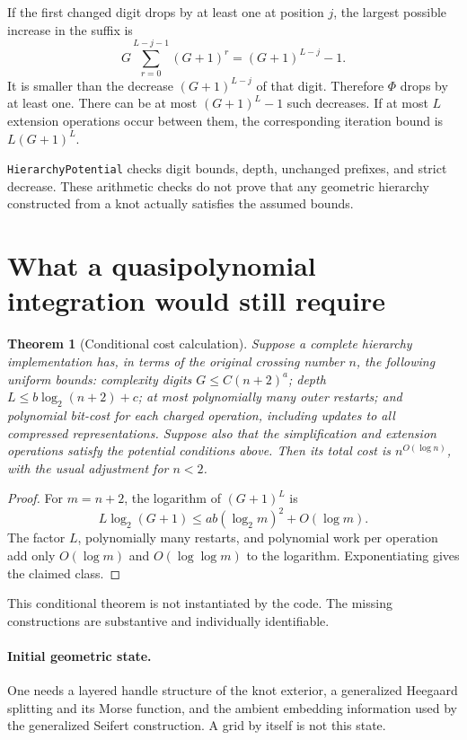 \documentclass[11pt]{article}
\newtheorem{theorem}{Theorem}[section]
\newcommand{\code}[1]{\texttt{#1}}
\begin{document}
If the first changed digit drops by at least one at position $j$, the largest
possible increase in the suffix is
\[
 G\sum_{r=0}^{L-j-1}(G+1)^r=(G+1)^{L-j}-1.
\]
It is smaller than the decrease $(G+1)^{L-j}$ of that digit. Therefore $\Phi$
drops by at least one. There can be at most $(G+1)^L-1$ such decreases.
If at most $L$ extension operations occur between them, the corresponding
iteration bound is $L(G+1)^L$.

\code{HierarchyPotential} checks digit bounds, depth, unchanged prefixes, and
strict decrease. These arithmetic checks do not prove that any geometric
hierarchy constructed from a knot actually satisfies the assumed bounds.

\section{What a quasipolynomial integration would still require}
\begin{theorem}[Conditional cost calculation]
Suppose a complete hierarchy implementation has, in terms of the original
crossing number $n$, the following uniform bounds: complexity digits
$G\leq C(n+2)^a$; depth $L\leq b\log_2(n+2)+c$; at most polynomially many
outer restarts; and polynomial bit-cost for each charged operation, including
updates to all compressed representations. Suppose also that the simplification
and extension operations satisfy the potential conditions above. Then its total
cost is $n^{O(\log n)}$, with the usual adjustment for $n<2$.
\end{theorem}
\begin{proof}
For $m=n+2$, the logarithm of $(G+1)^L$ is
\[
 L\log_2(G+1)\leq ab(\log_2 m)^2+O(\log m).
\]
The factor $L$, polynomially many restarts, and polynomial work per operation
add only $O(\log m)$ and $O(\log\log m)$ to the logarithm. Exponentiating gives
the claimed class.
\end{proof}

This conditional theorem is not instantiated by the code. The missing
constructions are substantive and individually identifiable.

\paragraph{Initial geometric state.}
One needs a layered handle structure of the knot exterior, a generalized
Heegaard splitting and its Morse function, and the ambient embedding information
used by the generalized Seifert construction. A grid by itself is not this state.
\end{document}
